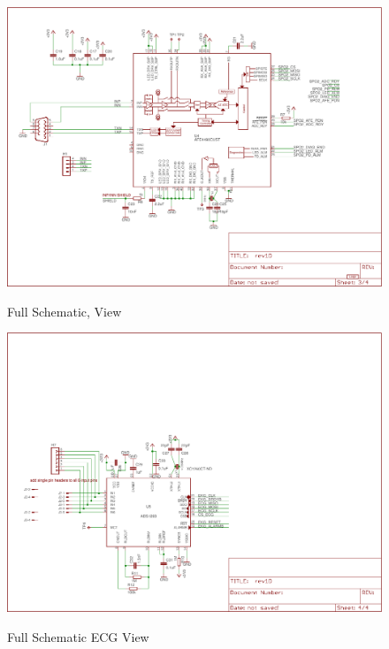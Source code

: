 \begin{figure}
	\begin{center}
		\label{fig:FullSchematic_Sheet3}
		\includegraphics[angle=90,scale=1,width=1\textwidth]{Images/rev1D_sheet3-cropped.pdf} 
		\caption{Full Schematic,  View}
	\end{center}
\end{figure}

\begin{figure}
	\begin{center}
		\label{fig:FullSchematic_Sheet4}
		\includegraphics[angle=90,scale=1,width=1\textwidth]{Images/rev1D_sheet4-cropped.pdf} 
		\caption{Full Schematic ECG View}
	\end{center}
\end{figure}

